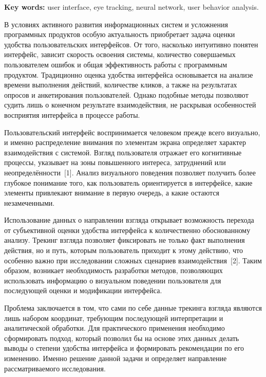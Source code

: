 \documentclass[12pt,a4paper]{article}
\begin{document}
\vspace{0.3cm}

\noindent
\textbf{Key words:}
user interface, eye tracking, neural network, user behavior analysis.

\vspace{0.8cm}

В условиях активного развития информационных систем и усложнения
программных продуктов особую актуальность приобретает задача оценки
удобства пользовательских интерфейсов. От того, насколько интуитивно
понятен интерфейс, зависит скорость освоения системы, количество
совершаемых пользователем ошибок и общая эффективность работы с
программным продуктом. Традиционно оценка удобства интерфейса
основывается на анализе времени выполнения действий, количестве кликов,
а также на результатах опросов и анкетирования пользователей. Однако
подобные методы позволяют судить лишь о конечном результате
взаимодействия, не раскрывая особенностей восприятия интерфейса
в процессе работы.

Пользовательский интерфейс воспринимается человеком прежде всего
визуально, и именно распределение внимания по элементам экрана
определяет характер взаимодействия с системой. Взгляд пользователя
отражает его когнитивные процессы, указывает на зоны повышенного
интереса, затруднений или неопределённости~[1]. Анализ визуального
поведения позволяет получить более глубокое понимание того, как
пользователь ориентируется в интерфейсе, какие элементы привлекают
внимание в первую очередь, а какие остаются незамеченными.

Использование данных о направлении взгляда открывает возможность
перехода от субъективной оценки удобства интерфейса к количественно
обоснованному анализу. Трекинг взгляда позволяет фиксировать не только
факт выполнения действия, но и путь, которым пользователь приходит
к этому действию, что особенно важно при исследовании сложных
сценариев взаимодействия~[2]. Таким образом, возникает необходимость
разработки методов, позволяющих использовать информацию о визуальном
поведении пользователя для последующей оценки и модификации интерфейса.

Проблема заключается в том, что сами по себе данные трекинга взгляда
являются лишь набором координат, требующим последующей интерпретации
и аналитической обработки. Для практического применения необходимо
сформировать подход, который позволил бы на основе этих данных делать
выводы о степени удобства интерфейса и формировать рекомендации
по его изменению. Именно решение данной задачи и определяет направление
рассматриваемого исследования.
\end{document}
